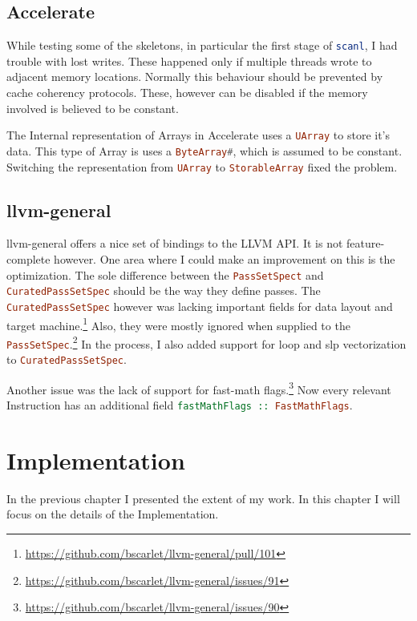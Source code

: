 \documentclass[a4paper,bibliography=totocnumbered,parskip,headsepline]{scrbook}
\begin{document}
\section{Accelerate}
While testing some of the skeletons, in particular the first stage of \lstinline[language=haskell]!scanl!, I had trouble with lost writes.
These happened only if multiple threads wrote to adjacent memory locations.
Normally this behaviour should be prevented by cache coherency protocols.
These, however can be disabled if the memory involved is believed to be constant.

The Internal representation of Arrays in Accelerate uses a \lstinline[language=haskell]!UArray! to store it's data.
This type of Array is uses a \lstinline[language=haskell]!ByteArray#!, which is assumed to be constant.
Switching the representation from \lstinline[language=haskell]!UArray! to \lstinline[language=haskell]!StorableArray! fixed the problem.

\section{llvm-general}
llvm-general offers a nice set of bindings to the LLVM API.
It is not feature-complete however.
One area where I could make an improvement on this is the optimization.
The sole difference between the \lstinline[language=haskell]!PassSetSpect! and \lstinline[language=haskell]!CuratedPassSetSpec! should be the way they define passes.
The \lstinline[language=haskell]!CuratedPassSetSpec! however was lacking important fields for data layout and target machine.\footnote{\url{https://github.com/bscarlet/llvm-general/pull/101}}
Also, they were mostly ignored when supplied to the \lstinline[language=haskell]!PassSetSpec!.\footnote{\url{https://github.com/bscarlet/llvm-general/issues/91}}
In the process, I also added support for loop and slp vectorization to \lstinline[language=haskell]!CuratedPassSetSpec!.

Another issue was the lack of support for fast-math flags.\footnote{\url{https://github.com/bscarlet/llvm-general/issues/90}}
Now every relevant Instruction has an additional field \lstinline[language=haskell]!fastMathFlags :: FastMathFlags!.

\chapter{Implementation}
In the previous chapter I presented the extent of my work.
In this chapter I will focus on the details of the Implementation.
\end{document}
